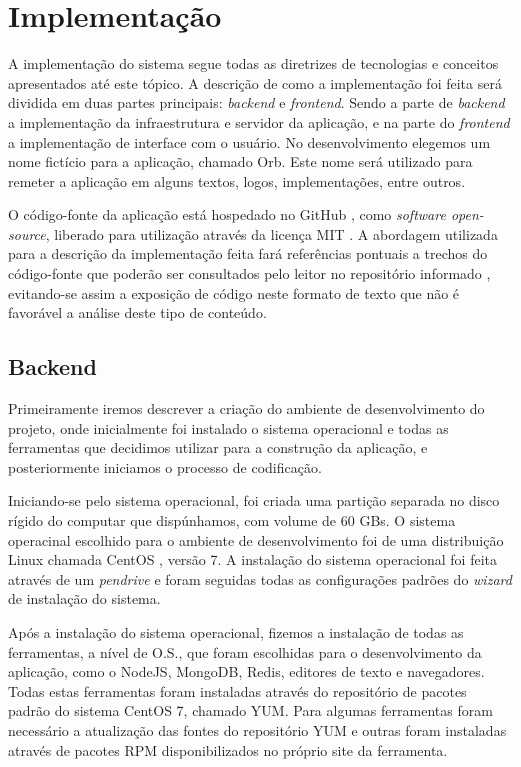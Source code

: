 \chapter{Implementação}
A implementação do sistema segue todas as diretrizes de tecnologias e conceitos apresentados até este tópico. A descrição de como a implementação foi feita será dividida em duas partes principais: \textit{backend} e \textit{frontend}. Sendo a parte de \textit{backend} a implementação da infraestrutura e servidor da aplicação, e na parte do \textit{frontend} a implementação de interface com o usuário. No desenvolvimento elegemos um nome fictício para a aplicação, chamado Orb. Este nome será utilizado para remeter a aplicação em alguns textos, logos, implementações, entre outros.

O código-fonte da aplicação está hospedado no GitHub \cite{orb}, como \textit{software open-source}, liberado para utilização através da licença MIT \cite{mit}. A abordagem utilizada para a descrição da implementação feita fará referências pontuais a trechos do código-fonte que poderão ser consultados pelo leitor no repositório informado \cite{orb}, evitando-se assim a exposição de código neste formato de texto que não é favorável a análise deste tipo de conteúdo.

\section{Backend}
Primeiramente iremos descrever a criação do ambiente de desenvolvimento do projeto, onde inicialmente foi instalado o sistema operacional e todas as ferramentas que decidimos utilizar para a construção da aplicação, e posteriormente iniciamos o processo de codificação.

Iniciando-se pelo sistema operacional, foi criada uma partição separada no disco rígido do computar que dispúnhamos, com volume de 60 GBs. O sistema operacinal escolhido para o ambiente de desenvolvimento foi de uma distribuição Linux chamada CentOS \cite{centos}, versão 7. A instalação do sistema operacional foi feita através de um \textit{pendrive} e foram seguidas todas as configurações padrões do \textit{wizard} de instalação do sistema.

Após a instalação do sistema operacional, fizemos a instalação de todas as ferramentas, a nível de O.S., que foram escolhidas para o desenvolvimento da aplicação, como o NodeJS, MongoDB, Redis, editores de texto e navegadores. Todas estas ferramentas foram instaladas através do repositório de pacotes padrão do sistema CentOS 7, chamado YUM. Para algumas ferramentas foram necessário a atualização das fontes do repositório YUM e outras foram instaladas através de pacotes RPM disponibilizados no próprio site da ferramenta.

